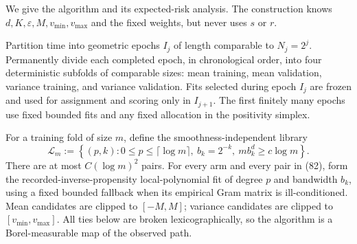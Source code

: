 We give the algorithm and its expected-risk analysis. The construction knows \(d,K,\varepsilon,M,v_{\min},v_{\max}\) and the fixed weights, but never uses \(s\) or \(r\).

Partition time into geometric epochs \(I_j\) of length comparable to \(N_j=2^j\). Permanently divide each completed epoch, in chronological order, into four deterministic subfolds of comparable sizes: mean training, mean validation, variance training, and variance validation. Fits selected during epoch \(I_j\) are frozen and used for assignment and scoring only in \(I_{j+1}\). The first finitely many epochs use fixed bounded fits and any fixed allocation in the positivity simplex.

For a training fold of size \(m\), define the smoothness-independent library
\[
\mathcal L_m:=
\left\{(p,k):0\leq p\leq\lceil\log m\rceil,
\ b_k=2^{-k},\ mb_k^d\geq c\log m\right\}.
\tag{82}
\]
There are at most \(C(\log m)^2\) pairs. For every arm and every pair in (82), form the recorded-inverse-propensity local-polynomial fit of degree \(p\) and bandwidth \(b_k\), using a fixed bounded fallback when its empirical Gram matrix is ill-conditioned. Mean candidates are clipped to \([-M,M]\); variance candidates are clipped to \([v_{\min},v_{\max}]\). All ties below are broken lexicographically, so the algorithm is a Borel-measurable map of the observed path.

